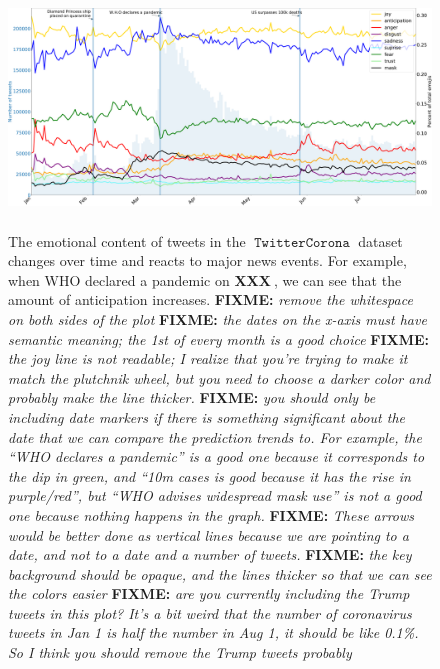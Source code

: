 \documentclass[11pt]{article}
\newcommand{\fixme}[1]{{\color{red} \textbf{FIXME:} {\textit {#1}}}}
\newcommand{\XXX}{\textbf{XXX}~}
\DeclareMathOperator{\corona}{\texttt{TwitterCorona}}
\begin{document}
\begin{figure}
    \centering
    \includegraphics[width=\textwidth,height=2.5in]{images/twitter_graph_fix.pdf}
    \caption{
        The emotional content of tweets in the $\corona$ dataset changes over time and reacts to major news events.
        For example, when WHO declared a pandemic on $\XXX$, we can see that the amount of anticipation increases.
        \fixme{remove the whitespace on both sides of the plot}
        \fixme{the dates on the x-axis must have semantic meaning;
        the 1st of every month is a good choice}
        \fixme{the joy line is not readable; I realize that you're trying to make it match the plutchnik wheel, but you need to choose a darker color and probably make the line thicker.}
        \fixme{you should only be including date markers if there is something significant about the date that we can compare the prediction trends to.  For example, the ``WHO declares a pandemic'' is a good one because it corresponds to the dip in green, and ``10m cases is good because it has the rise in purple/red'', but ``WHO advises widespread mask use'' is not a good one because nothing happens in the graph.}
        \fixme{These arrows would be better done as vertical lines because we are pointing to a date, and not to a date and a number of tweets.}
        \fixme{the key background should be opaque, and the lines thicker so that we can see the colors easier}
        \fixme{are you currently including the Trump tweets in this plot?  It's a bit weird that the number of coronavirus tweets in Jan 1 is half the number in Aug 1, it should be like 0.1\%.  So I think you should remove the Trump tweets probably}
    }
    \label{fig:tweets_per_day_sent}
\end{figure}
\end{document}
